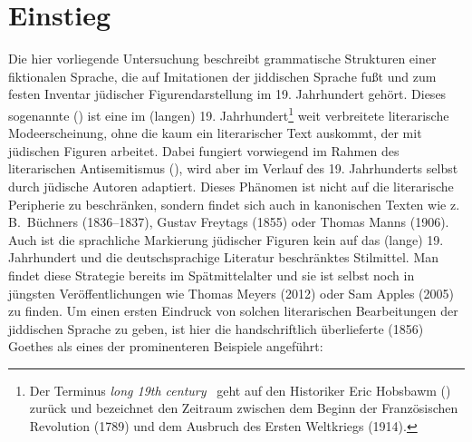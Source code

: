  
 \chapter{Einstieg}

\largerpage
Die hier vorliegende Untersuchung beschreibt grammatische Strukturen einer fiktionalen Sprache, die auf Imitationen der jiddischen Sprache fußt und zum festen Inventar jüdischer Figurendarstellung im 19. Jahrhundert gehört. Dieses sogenannte  (\citealt{Richter1995}) ist eine im (langen) 19. Jahrhundert\footnote{Der Terminus \textit{long 19th century} \,%
geht auf den Historiker Eric Hobsbawm (\citeyear{Hobsbawm1962,Hobsbawm1975,Hobsbawm1987}) zurück und bezeichnet den Zeitraum zwischen dem Beginn der Französischen Revolution (1789) und dem Ausbruch des Ersten Weltkriegs (1914).} weit verbreitete literarische Modeerscheinung, ohne die kaum ein literarischer Text auskommt, der mit jüdischen Figuren arbeitet. Dabei fungiert  vorwiegend im Rahmen des literarischen Antisemitismus (\citealt[vgl.\,][309]{Gubser1998}), wird aber im Verlauf des 19. Jahrhunderts selbst durch jüdische Autoren adaptiert. Dieses Phänomen ist nicht auf die literarische Peripherie zu beschränken, sondern findet sich auch in kanonischen Texten wie z.\,B.\, Büchners  (1836–1837), Gustav Freytags  (1855) oder Thomas Manns  (1906). Auch ist die sprachliche Markierung jüdischer Figuren kein auf das (lange) 19. Jahrhundert und die deutschsprachige Literatur beschränktes Stilmittel. Man findet diese Strategie bereits im Spätmittelalter und sie ist selbst noch in jüngsten Veröffentlichungen wie Thomas Meyers  (2012) oder Sam Apples  (2005) zu finden. Um einen ersten Eindruck von solchen literarischen Bearbeitungen der jiddischen Sprache zu geben, ist hier die handschriftlich überlieferte  (1856) Goethes als eines der prominenteren Beispiele angeführt: 
 

